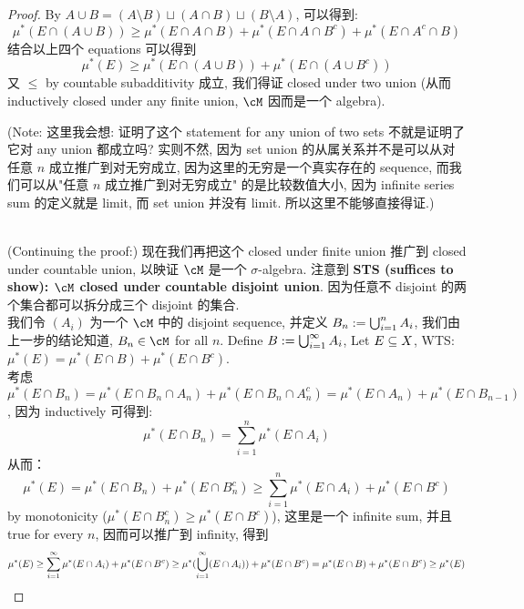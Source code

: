 \documentclass[lang=cn,11pt]{elegantbook}
\begin{document}
\begin{proof}
By  $A \cup B = (A \setminus B) \sqcup (A\cap B) \sqcup (B\setminus A)$, 可以得到:
\begin{equation}
   \mu^*(E \cap (A\cup B)) \geq \mu^*(E \cap A \cap B) + \mu^*(E \cap A \cap B^c) + \mu^*(E \cap A^c \cap B)
\end{equation}
结合以上四个 equations 可以得到
\begin{equation}
    \mu^*(E) \geq \mu^*(E\cap (A\cup B)) + \mu^*(E\cap (A \cup B^c))
\end{equation}
又 $\leq$ by countable subadditivity 成立, 我们得证 closed under two union (从而 inductively closed under any finite union, $\cM$ 因而是一个 algebra).\\
\begin{remark}
    (Note: 这里我会想: 证明了这个 statement for any union of two sets 不就是证明了它对 any union 都成立吗? 实则不然, 因为 set union 的从属关系并不是可以从对任意 $n$ 成立推广到对无穷成立, 因为这里的无穷是一个真实存在的 sequence, 而我们可以从"任意 $n$ 成立推广到对无穷成立" 的是比较数值大小, 因为 infinite series sum 的定义就是 limit, 而 set union 并没有 limit. 所以这里不能够直接得证.)\\\\
\end{remark}
\noindent (Continuing the proof:)
\noindent 现在我们再把这个 closed under finite union 推广到 closed under countable union, 以映证 $\cM$ 是一个 $\sigma$-algebra. 注意到 \textbf{STS (suffices to show): $\cM$ closed under countable disjoint union}. 因为任意不 disjoint 的两个集合都可以拆分成三个 disjoint 的集合.\\
\noindent 我们令 $(A_i)$ 为一个 $\cM$ 中的 disjoint sequence, 并定义 $B_n := \bigcup_{i=1}^n A_i$, 我们由上一步的结论知道, $B_n \in \cM$ for all $n$.  
\noindent Define $B := \bigcup_{i=1}^\infty A_i$,  Let $E\subseteq X$, WTS: $\mu^*(E ) = \mu^*(E \cap B) + \mu^*(E\cap B^c)$.
\\
\noindent 考虑 $\mu^*(E \cap B_n ) = \mu^*(E \cap B_n \cap A_n) + \mu^*(E \cap B_n \cap A_n^c) = \mu^*(E \cap A_n) + \mu^*(E \cap B_{n-1})$, 因为 inductively 可得到:
\begin{equation}
    \mu^*(E \cap B_n) = \sum_{i=1}^n \mu^*(E \cap A_i)
\end{equation}
\noindent 从而：
\begin{equation}
    \mu^*(E) = \mu^*(E \cap B_n) + \mu^*(E\cap B_n^c) \geq \sum_{i=1}^n \mu^*(E\cap A_i) + \mu^*(E \cap B^c)
\end{equation}
\noindent by monotonicity ($\mu^*(E\cap B_n^c) \geq \mu^*(E \cap B^c)$), 这里是一个 infinite sum, 并且 true for every $n$, 因而可以推广到 infinity, 得到 
\begin{equation}
    \mu^*(E) \geq \sum_{i=1}^\infty \mu^*(E\cap A_i) + \mu^*(E \cap B^c) \geq \mu^*(\bigcup_{i=1}^\infty (E \cap A_i)) + \mu^*(E \cap B^c) = \mu^*(E\cap B) + \mu^*(E \cap B^c) \geq \mu^*(E)
\end{equation}
\end{proof}
\end{document}

